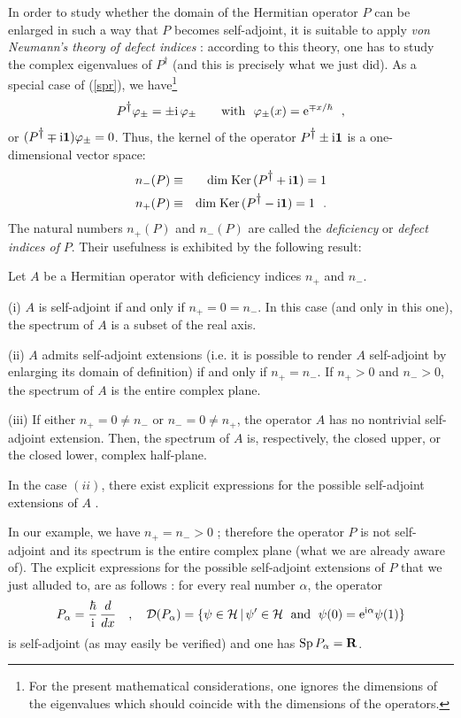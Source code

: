 \documentclass[a4wide,12pt]{report}
\begin{document}
In order to study whether the domain of the Hermitian 
operator $P$ 
can be enlarged in such a way that $P$ becomes self-adjoint, 
it is suitable to apply {\em von Neumann's theory of 
defect  indices} \cite{rs, sg}: 
according to this theory, 
one has to study the complex eigenvalues of 
$P^{\dag}$ (and this is precisely what we just did). 
As a special case of (\ref{spr}), we have\footnote{For 
the present mathematical considerations, one 
ignores the dimensions of the eigenvalues which should coincide
with the dimensions of the operators.} 
\[
P^{\displaystyle{\dagger}} \varphi_{\pm} = \pm {\rm i} \, \varphi_{\pm}
\qquad {\rm with} \ \ \varphi_{\pm} (x) = {\rm e}^{\mp x / \hbar}
\ \ ,
\]
or  
$(P^{\displaystyle{\dagger}} \mp {\rm i} {\bf 1})  \varphi_{\pm} =0$.
Thus, the kernel of the operator $P^{\displaystyle{\dagger}} \pm {\rm i} {\bf 1}$ 
is a one-dimensional vector space: 
\begin{eqnarray}
\label{defe1}
n_- (P) & \equiv & {\rm dim \; Ker} \,
(P^{\displaystyle{\dagger}} +  {\rm i} {\bf 1}) =1
\nonumber
\\
n_+ (P) & \equiv & {\rm dim \; Ker} \,
(P^{\displaystyle{\dagger}} -  {\rm i} {\bf 1}) = 1
\ \ .
\end{eqnarray}
The natural numbers 
$n_+ (P)$ and 
$n_- (P)$ are called the {\em deficiency} or {\em defect indices of} $P$. 
Their usefulness is exhibited by the following result:
\begin{theo}
Let $A$ be a Hermitian operator with deficiency indices
$n_+$ and $n_-$. 

\noindent 
{\rm (i)} 
$A$ is self-adjoint if and only if $n_+ = 0= n_-$.
In this case (and only in this one), the spectrum of $A$ is 
a subset of the real axis. 

\noindent 
{\rm (ii)}
$A$ admits self-adjoint extensions (i.e. it is possible to 
render $A$ self-adjoint by enlarging its domain of definition)
if and only if $n_+ =  n_-$.
 If $n_+ >0$ and $n_- >0$, the spectrum of $A$ is the entire 
 complex plane. 

\noindent 
{\rm (iii)} 
If either $n_+ =0 \neq n_-$ or $n_- =0 \neq  n_+$,
the operator $A$ has no nontrivial self-adjoint extension.
Then, the spectrum of $A$ is, respectively, 
the closed upper, or the closed lower, complex half-plane.
\end{theo}
In the case $(ii)$, there exist explicit expressions 
for the possible self-adjoint extensions of $A$ \cite{rs}. 

In our example, we have $n_+ =  n_- >0$ ; therefore the operator $P$ 
is not
self-adjoint and its spectrum is the entire complex plane 
(what we are already aware of). 
The explicit expressions for the possible 
self-adjoint extensions of $P$ that we just 
alluded to,  are as follows \cite{rs}: 
for every real number  $\alpha$, the operator  
\begin{equation}
\label{alpha}
P_{\alpha} = \displaystyle{\hbar \over {\rm i}} \, \displaystyle{d \over dx} \quad , \quad
{\cal D} (P_{\alpha}) = \{ \psi \in {\cal H} \, | \,
\psi^{\prime} \in {\cal H} \ \; {\rm and} \ \; \psi(0) =
{\rm e}^{{\rm i} \alpha} \psi(1) \}
\end{equation}
is self-adjoint (as may easily be verified) 
and one has 
${\rm Sp} \, P_{\alpha} = {\bf R}$.
\end{document}
